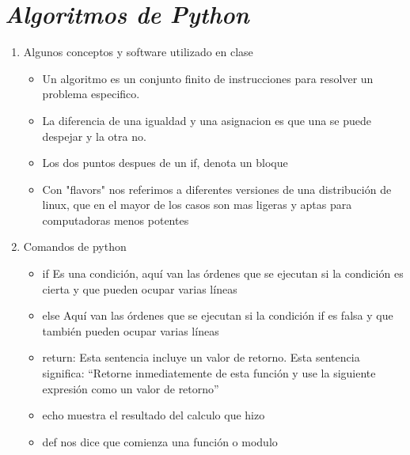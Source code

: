 \documentclass{book}
\begin{document}
\section{\textit{Algoritmos de Python}}%
\begin{flushright}
	\date{14 de enero de 2019}
\end{flushright}

\begin{enumerate}%
	\item Algunos conceptos y software utilizado en clase%
	\begin{itemize}
		\item Un algoritmo es un conjunto finito de instrucciones para resolver un problema especifico.
		\item La diferencia de una igualdad y una asignacion es que una se puede despejar y la otra no.			
		\item Los dos puntos despues de un if, denota un bloque
		\item Con "flavors" nos referimos a diferentes versiones de una distribución de linux, que en el mayor de los casos son mas ligeras y aptas para computadoras menos potentes
		
	\end{itemize}
	
	\item Comandos de python%
	\begin{itemize}%
		\item if Es una condición, aquí van las órdenes que se ejecutan si la condición es cierta
		y que pueden ocupar varias líneas
		\item else Aquí van las órdenes que se ejecutan si la condición if es falsa y que también pueden ocupar varias líneas
		\item return: Esta sentencia incluye un valor de retorno. Esta sentencia significa: “Retorne inmediatemente de esta función y use la siguiente expresión como un valor de retorno”
		\item echo muestra el resultado del calculo que hizo
		\item def nos dice que comienza una función o modulo
		

\end{itemize}
\end{enumerate}
\end{document}
